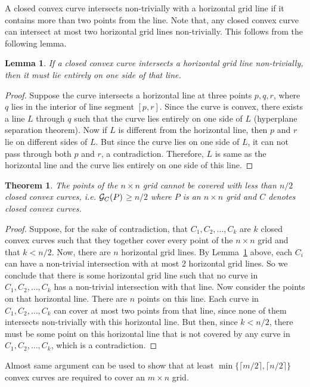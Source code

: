 \documentclass[
final
]{dmtcs-episciences}
\numberwithin{equation}{subsection}
\newtheorem{thm}[defn]{Theorem}%
\newtheorem{lem}[defn]{Lemma}%
\newcommand{\ga}{${\cal G}_C(P)$}
\begin{document}
A closed convex curve intersects non-trivially with a horizontal grid line if it contains more than two points from the line. Note that, any closed convex curve can intersect at most two horizontal grid lines non-trivially. This follows from the following lemma.
\begin{lem}
	If a closed convex curve intersects a horizontal grid line non-trivially, then it must lie entirely on one side of that line.
	\label{lem:oneside}
\end{lem}
\begin{proof}
	Suppose the curve intersects a horizontal line at three points $p, q, r$, where $q$ lies in the interior of line segment $[p,r]$. Since the curve is convex, there exists a line $L$ through $q$ such that the curve lies entirely on one side of $L$ (hyperplane separation theorem). Now if $L$ is different from the horizontal line, then $p$ and $r$ lie on different sides of $L$. But since the curve lies on one side of $L$, it can not pass through both $p$ and $r$, a contradiction. Therefore, $L$ is same as the horizontal line and the curve lies entirely on one side of this line.
\end{proof}
\begin{thm}
	The points of the $n\times n$ grid cannot be covered with less than $n/2$ closed convex curves, i.e. \ga $ \geq n/2$ where $P$ is an $n\times n$ grid and $C$ denotes closed convex curves.
\end{thm}
\begin{proof}
	Suppose, for the sake of contradiction, that $C_1,C_2,\ldots ,C_k$ are $k$ closed convex curves such that they together cover every point of the $n\times n$ grid and that $k < n/2$. Now, there are $n$ horizontal grid lines. By Lemma~\ref{lem:oneside} above, each $C_i$ can have a non-trivial intersection with at most 2 horizontal grid lines. So we conclude that there is some horizontal grid line such that no curve in $C_1, C_2,\ldots ,C_k$ has a non-trivial intersection with that line. Now consider the points on that horizontal line. There are $n$ points on this line. Each curve in $C_1, C_2, \ldots ,C_k$ can cover at most two points from that line, since none of them intersects non-trivially with this horizontal line. But then, since $k < n/2$, there must be some point on this horizontal line that is not covered by any curve in  $C_1, C_2,\ldots, C_k$, which is a contradiction.
\end{proof}


Almost same argument can be used to show that at least $\min{\{\lceil m/2\rceil , \lceil n/2\rceil \}}$ convex curves are required to cover an $m \times n$ grid.
\end{document}
